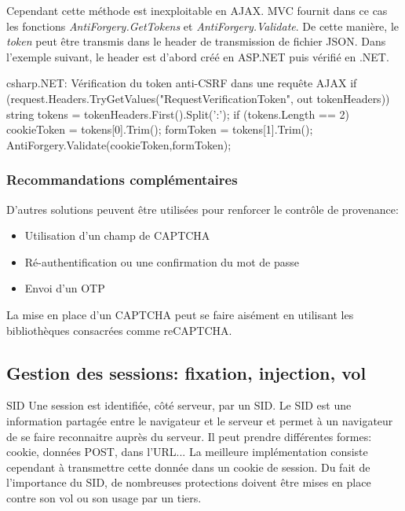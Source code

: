 Cependant cette méthode est inexploitable en AJAX. MVC fournit dans ce cas les fonctions \textit{AntiForgery.GetTokens} et \textit{AntiForgery.Validate}. De cette manière, le \textit{token} peut être transmis dans le header de transmission de fichier JSON. Dans l'exemple suivant, le header est d'abord créé en ASP.NET puis vérifié en .NET.

\begin{Config}{csharp}{.NET: Vérification du token anti-CSRF dans une requête AJAX}
if (request.Headers.TryGetValues("RequestVerificationToken", out tokenHeaders)){
	string tokens = tokenHeaders.First().Split(':');
	if (tokens.Length == 2){
		cookieToken = tokens[0].Trim();
		formToken = tokens[1].Trim();
	}
}
AntiForgery.Validate(cookieToken,formToken);
\end{Config}

\subsubsection{Recommandations complémentaires}
D'autres solutions peuvent être utilisées pour renforcer le contrôle de provenance:\begin{itemize}
\item Utilisation d'un champ de \gls{CAPTCHA}
\item Ré-authentification ou une confirmation du mot de passe
\item Envoi d'un \gls{OTP}
\end{itemize}

La mise en place d'un CAPTCHA peut se faire aisément en utilisant les bibliothèques consacrées comme reCAPTCHA.

\subsection{Gestion des sessions: fixation, injection, vol}
\begin{Define}{SID}
Une session est identifiée, côté serveur, par un \gls{SID}. Le SID est une information partagée entre le navigateur et le serveur et permet à un navigateur de se faire reconnaitre auprès du serveur. Il peut prendre différentes formes: cookie, données POST, dans l'URL... La meilleure implémentation consiste cependant à transmettre cette donnée dans un cookie de session. Du fait de l'importance du \gls{SID}, de nombreuses protections doivent être mises en place contre son vol ou son usage par un tiers.
\end{Define}

